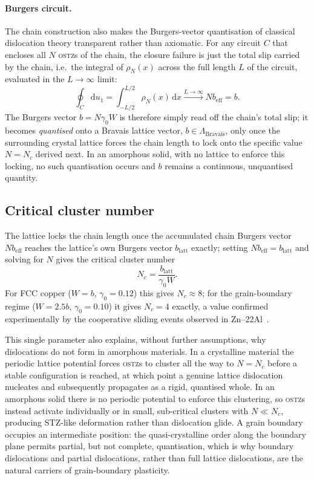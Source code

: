 \documentclass[5p,sort&compress]{elsarticle}
\newcommand{\OSTZ}{\textsc{ostz}}
\newcommand{\gz}{\gamma_0}
\newcommand{\beff}{b_\mathrm{eff}}
\begin{document}
\paragraph{Burgers circuit.}
The chain construction also makes the Burgers-vector quantisation of
classical dislocation theory transparent rather than axiomatic. For
any circuit $C$ that encloses all $N$ \OSTZ s of the chain, the
closure failure is just the total slip carried by the chain, i.e.\
the integral of $\rho_N(x)$ across the full length $L$ of the
circuit, evaluated in the $L\to\infty$ limit:
\[
  \oint_C\mathrm du_1=\int_{-L/2}^{L/2}\rho_N(x)\,\mathrm dx
  \xrightarrow{L\to\infty}N\beff=b.
\]
The Burgers vector $b=N\gz W$ is therefore simply read off the
chain's total slip; it becomes \emph{quantised} onto a Bravais
lattice vector, $b\in\Lambda_\mathrm{Bravais}$, only once the
surrounding crystal lattice forces the chain length to lock onto the
specific value $N=N_c$ derived next. In an amorphous solid, with no
lattice to enforce this locking, no such quantisation occurs and $b$
remains a continuous, unquantised quantity.

\subsection{Critical cluster number}
\label{sec:Nc}

The lattice locks the chain length once the accumulated chain
Burgers vector $N\beff$ reaches the lattice's own Burgers vector
$b_\mathrm{latt}$ exactly; setting $N\beff=b_\mathrm{latt}$ and
solving for $N$ gives the critical cluster number
\begin{equation}
  \boxed{N_c=\frac{b_\mathrm{latt}}{\gz W}.}
  \label{eq:Nc}
\end{equation}
For FCC copper ($W=b$, $\gz=0.12$) this gives $N_c\approx8$; for the
grain-boundary regime ($W=2.5b$, $\gz=0.10$) it gives $N_c=4$ exactly,
a value confirmed experimentally by the cooperative sliding events
observed in Zn--22Al~\cite{astanin-part2}.

This single parameter also explains, without further assumptions,
why dislocations do not form in amorphous materials. In a
crystalline material the periodic lattice potential forces \OSTZ s
to cluster all the way to $N=N_c$ before a stable configuration is
reached, at which point a genuine lattice dislocation nucleates and
subsequently propagates as a rigid, quantised whole. In an amorphous
solid there is no periodic potential to enforce this clustering, so
\OSTZ s instead activate individually or in small, sub-critical
clusters with $N\ll N_c$, producing STZ-like deformation rather than
dislocation glide. A grain boundary occupies an intermediate
position: the quasi-crystalline order along the boundary plane
permits partial, but not complete, quantisation, which is why
boundary dislocations and partial dislocations, rather than full
lattice dislocations, are the natural carriers of grain-boundary
plasticity.
\end{document}
